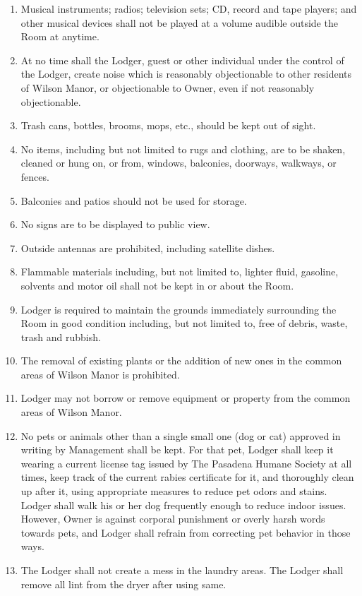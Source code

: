 \documentclass[12pt,letterpaper]{article}
\newcommand{\lodger}{Lodger}
\newcommand{\management}{Management}
\newcommand{\condo}{Wilson Manor}
\newcommand{\room}{Room}
\begin{document}
\begin{enumerate}
		\item Musical instruments; radios; television sets; CD, record and tape players; and other musical devices shall not be played at a volume audible outside the \room{} at anytime. 
		\item At no time shall the \lodger{}, guest or other individual under the control of the \lodger{}, create noise which is reasonably objectionable to other residents of \condo{}, or objectionable to Owner, even if not reasonably objectionable. 
		\item Trash cans, bottles, brooms, mops, etc., should be kept out of sight.
		\item No items, including but not limited to rugs and clothing, are to be shaken, cleaned or hung on, or from, windows, balconies, doorways, walkways, or fences. 
		\item Balconies and patios should not be used for storage.
		\item No signs are to be displayed to public view.
		\item Outside antennas are prohibited, including satellite dishes.
		\item Flammable materials including, but not limited to, lighter fluid, gasoline, solvents and motor oil shall not be kept in or about the \room{}. 
		\item \lodger{} is required to maintain the grounds immediately surrounding the \room{} in good condition including, but not limited to, free of debris, waste, trash and rubbish. 
		\item The removal of existing plants or the addition of new ones in the common areas of \condo{} is prohibited.
		\item \lodger{} may not borrow or remove equipment or property from the common areas of \condo{}. 
		\item No pets or animals other than a single small one (dog or cat) approved in writing by \management{} shall be kept. For that pet, \lodger{} shall keep it wearing a current license tag issued by The Pasadena Humane Society at all times, keep track of the current rabies certificate for it, and thoroughly clean up after it, using appropriate measures to reduce pet odors and stains. \lodger{} shall walk his or her dog frequently enough to reduce indoor issues. However, Owner is against corporal punishment or overly harsh words towards pets, and \lodger{} shall refrain from correcting pet behavior in those ways.
		\item The \lodger{} shall not create a mess in the laundry areas. The \lodger{} shall remove all lint from the dryer after using same. 

\end{enumerate}
\end{document}
